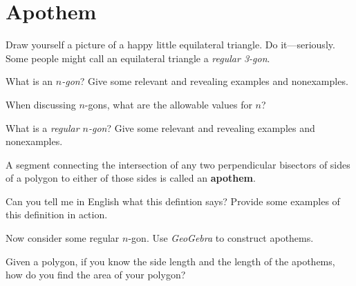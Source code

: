 \newpage
\section{Apothem} %

Draw yourself a picture of a happy little equilateral triangle. Do
it---seriously.  Some people might call an equilateral triangle a
\textit{regular 3-gon}.

\begin{prob} 
What is an \textit{$n$-gon}? Give some relevant and revealing examples
and nonexamples.
\end{prob}

\begin{prob} 
When discussing $n$-gons, what are the allowable values for $n$?
\end{prob}

\begin{prob} 
What is a \textit{regular $n$-gon}? Give some relevant and revealing
examples and nonexamples.
\end{prob}


\begin{dfn} 
A segment connecting the intersection of any two perpendicular
bisectors of sides of a polygon to either of those sides is called an
\textbf{apothem}.
\end{dfn}

\begin{prob}
Can you tell me in English what this defintion says? Provide some
examples of this definition in action.
\end{prob}



\begin{prob} 
Now consider some regular $n$-gon. Use \textsl{GeoGebra} to construct
apothems.
\end{prob}



\begin{prob}
Given a polygon, if you know the side length and the length of the
apothems, how do you find the area of your polygon? 
\end{prob}


